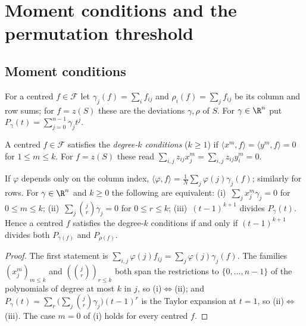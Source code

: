 \section{Moment conditions and the permutation threshold}
\label{sec:theory}

\subsection{Moment conditions}
\label{sec:theory_hierarchy}

For a centred $f\in\mathcal F$ let $\gamma_j(f)=\sum_if_{ij}$ and $\rho_i(f)=\sum_jf_{ij}$ be its column and row sums; for $f=z(S)$ these are the deviations $\gamma,\rho$ of $S$.
For $\gamma\in\R^n$ put $P_\gamma(t)=\sum_{j=0}^{n-1}\gamma_jt^j$.

\begin{definition}
\label{def:degree_k}
A centred $f\in\mathcal F$ satisfies the \emph{degree-$k$ conditions} ($k\ge1$) if $\langle x^{m},f\rangle=\langle y^{m},f\rangle=0$ for $1\le m\le k$.
For $f=z(S)$ these read $\sum_{i,j}z_{ij}x_j^m=\sum_{i,j}z_{ij}y_i^m=0$.
\end{definition}

\begin{lemma}
\label{lem:poly_form}
If $\varphi$ depends only on the column index, $\langle\varphi,f\rangle=\frac1N\sum_j\varphi(j)\gamma_j(f)$; similarly for rows.
For $\gamma\in\R^{n}$ and $k\ge0$ the following are equivalent:
(i)~$\sum_jx_j^{m}\gamma_j=0$ for $0\le m\le k$;
(ii)~$\sum_j\binom{j}{r}\gamma_j=0$ for $0\le r\le k$;
(iii)~$(t-1)^{k+1}$ divides $P_\gamma(t)$.
Hence a centred $f$ satisfies the degree-$k$ conditions if and only if $(t-1)^{k+1}$ divides both $P_{\gamma(f)}$ and $P_{\rho(f)}$.
\end{lemma}

\begin{proof}
The first statement is $\sum_{i,j}\varphi(j)f_{ij}=\sum_j\varphi(j)\gamma_j(f)$.
The families $(x_j^{m})_{m\le k}$ and $(\binom{j}{r})_{r\le k}$ both span the restrictions to $\{0,\dots,n-1\}$ of the polynomials of degree at most $k$ in $j$, so (i)$\Leftrightarrow$(ii); and $P_\gamma(t)=\sum_{r}\bigl(\sum_j\binom jr\gamma_j\bigr)(t-1)^{r}$ is the Taylor expansion at $t=1$, so (ii)$\Leftrightarrow$(iii).
The case $m=0$ of (i) holds for every centred $f$.
\end{proof}

